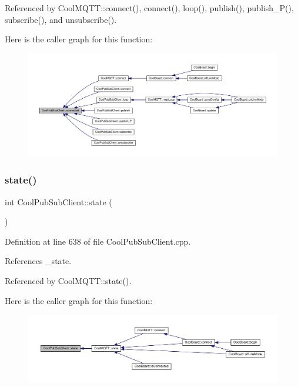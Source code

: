 Referenced by Cool\+M\+Q\+T\+T\+::connect(), connect(), loop(), publish(), publish\+\_\+\+P(), subscribe(), and unsubscribe().

Here is the caller graph for this function\+:
\nopagebreak
\begin{figure}[H]
\begin{center}
\leavevmode
\includegraphics[width=350pt]{d8/d4b/class_cool_pub_sub_client_a3d5a5da4ddb1e5c1bea64d80c665d148_icgraph}
\end{center}
\end{figure}
\mbox{\label{class_cool_pub_sub_client_a3245a5afc6d22e61270dcfe392ccb866}} 
\subsubsection{\texorpdfstring{state()}{state()}}
{\footnotesize\ttfamily int Cool\+Pub\+Sub\+Client\+::state (\begin{DoxyParamCaption}{ }\end{DoxyParamCaption})}



Definition at line 638 of file Cool\+Pub\+Sub\+Client.\+cpp.



References \+\_\+state.



Referenced by Cool\+M\+Q\+T\+T\+::state().

Here is the caller graph for this function\+:
\nopagebreak
\begin{figure}[H]
\begin{center}
\leavevmode
\includegraphics[width=350pt]{d8/d4b/class_cool_pub_sub_client_a3245a5afc6d22e61270dcfe392ccb866_icgraph}
\end{center}
\end{figure}
\mbox{\label{class_cool_pub_sub_client_a4f83e54f1ba96e32f725d93cdec283b7}} 
